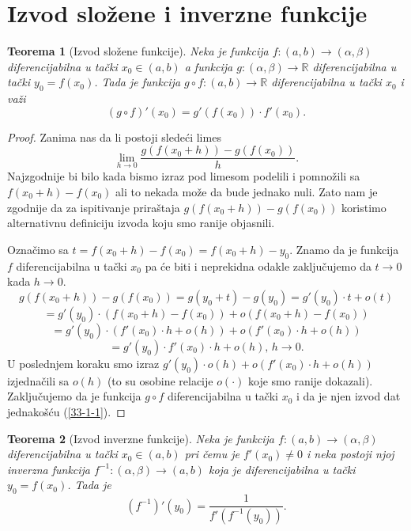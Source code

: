 \documentclass[a4paper,12pt]{article}
\theoremstyle{plain}
\newtheorem{theorem}{Teorema}[section]
\theoremstyle{definition}
\theoremstyle{remark}
\begin{document}
\section{Izvod složene i inverzne funkcije}
\begin{theorem}[Izvod složene funkcije]
Neka je funkcija $f : (a, b) \to (\alpha, \beta)$ diferencijabilna u tački $x_0 \in (a, b)$ a funkcija $g : (\alpha, \beta) \to \mathbb{R}$ diferencijabilna u tački $y_0 = f(x_0)$. Tada je funkcija $g \circ f : (a, b) \to \mathbb{R}$ diferencijabilna u tački $x_0$ i važi
\begin{equation} (g \circ f)'(x_0) = g'(f(x_0)) \cdot f'(x_0). \label{33-1-1} \end{equation}
\end{theorem}

\begin{proof}
Zanima nas da li postoji sledeći limes
\begin{equation} \lim_{h \to 0} \frac{g(f(x_0 + h)) - g(f(x_0))}{h}. \label{33-1-2} \end{equation}
Najzgodnije bi bilo kada bismo izraz pod limesom podelili i pomnožili sa $f(x_0 + h) - f(x_0)$ ali to nekada može da bude jednako nuli. Zato nam je zgodnije da za ispitivanje priraštaja $g(f(x_0 + h)) - g(f(x_0))$ koristimo alternativnu definiciju izvoda koju smo ranije objasnili.

Označimo sa $t = f(x_0 + h) - f(x_0) = f(x_0 + h) - y_0$. Znamo da je funkcija $f$ diferencijabilna u tački $x_0$ pa će biti i neprekidna odakle zaključujemo da $t \to 0$ kada $h \to 0$.
$$ g(f(x_0 + h)) - g(f(x_0)) = g(y_0 + t) - g(y_0) = g'(y_0) \cdot t + o(t) $$
$$ = g'(y_0) \cdot (f(x_0 + h) - f(x_0)) + o(f(x_0 + h) - f(x_0)) $$
$$ = g'(y_0) \cdot (f'(x_0) \cdot h + o(h)) + o(f'(x_0) \cdot h + o(h)) $$
$$ = g'(y_0) \cdot f'(x_0) \cdot h + o(h), \, h \to 0. $$
U poslednjem koraku smo izraz $g'(y_0) \cdot o(h) + o(f'(x_0) \cdot h + o(h))$ izjednačili sa $o(h)$ (to su osobine relacije $o(\cdot)$ koje smo ranije dokazali). Zaključujemo da je funkcija $g \circ f$ diferencijabilna u tački $x_0$ i da je njen izvod dat jednakošću (\ref{33-1-1}).
\end{proof}

\begin{theorem}[Izvod inverzne funkcije]
Neka je funkcija $f : (a, b) \to (\alpha, \beta)$ diferencijabilna u tački $x_0 \in (a, b)$ pri čemu je $f'(x_0) \neq 0$ i neka postoji njoj inverzna funkcija $f^{-1} : (\alpha, \beta) \to (a, b)$ koja je diferencijabilna u tački $y_0 = f(x_0)$. Tada je
$$ (f^{-1})'(y_0) = \frac{1}{f'(f^{-1}(y_0))}. $$
\end{theorem}
\end{document}
